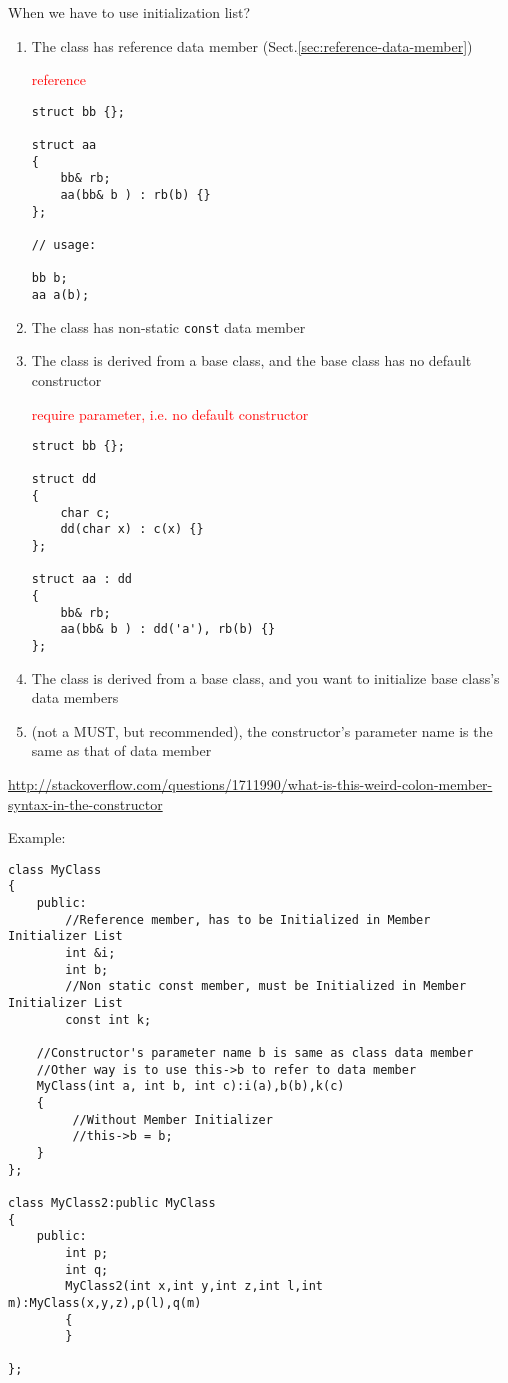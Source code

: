 When we have to use initialization list?
\begin{enumerate}
  \item  The class has reference data member
  (Sect.\ref{sec:reference-data-member})

\textcolor{red}{reference}
\begin{verbatim}
struct bb {};

struct aa
{
    bb& rb;
    aa(bb& b ) : rb(b) {}
};

// usage:

bb b;
aa a(b);
\end{verbatim}
  
  \item The class has non-static \verb!const! data member
  
  \item The class is derived from a base class, and the base class has no
  default constructor

\textcolor{red}{require parameter, i.e. no default constructor}
\begin{verbatim}
struct bb {};

struct dd
{
    char c;
    dd(char x) : c(x) {}
};

struct aa : dd
{
    bb& rb;
    aa(bb& b ) : dd('a'), rb(b) {}
};
\end{verbatim}


    
  \item The class is derived from a base class, and you want to initialize base
  class's data members

  
  \item (not a MUST, but recommended), the constructor's parameter name is the
  same as that of data member
\end{enumerate}
\url{http://stackoverflow.com/questions/1711990/what-is-this-weird-colon-member-syntax-in-the-constructor}

Example:
\begin{lstlisting}
class MyClass
{
    public:
        //Reference member, has to be Initialized in Member Initializer List
        int &i;       
        int b;
        //Non static const member, must be Initialized in Member Initializer List
        const int k;  

    //Constructor's parameter name b is same as class data member 
    //Other way is to use this->b to refer to data member
    MyClass(int a, int b, int c):i(a),b(b),k(c)
    {
         //Without Member Initializer
         //this->b = b;
    }
};

class MyClass2:public MyClass
{
    public:
        int p;
        int q;
        MyClass2(int x,int y,int z,int l,int m):MyClass(x,y,z),p(l),q(m)
        {
        }

};
\end{lstlisting}

